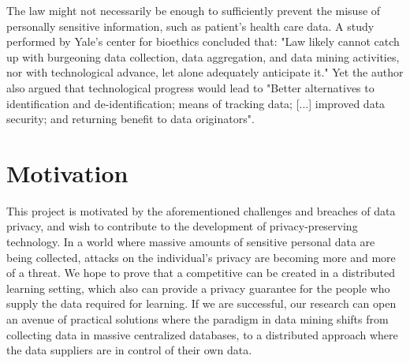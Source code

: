The law might not necessarily be enough to sufficiently prevent the misuse of personally sensitive information, such as patient's health care data. A study performed by Yale's center for bioethics concluded that: "Law likely cannot catch up with burgeoning data collection, data aggregation, and data
mining activities, nor with technological advance, let alone adequately anticipate it." Yet the author also argued that technological progress would lead to "Better alternatives to identification and de-identification;  means of tracking data; [...] improved data security; and returning benefit to data originators"\cite{kaplan2014patient}.

\section{Motivation}
This project is motivated by the aforementioned challenges and breaches of data privacy, and wish to contribute to the development of privacy-preserving technology. In a world where massive amounts of sensitive personal data are being collected, attacks on the individual's privacy are becoming more and more of a threat. We hope to prove that a competitive can be created in a distributed learning setting, which also can provide a privacy guarantee for the people who supply the data required for learning. If we are successful, our research can open an avenue of practical solutions where the paradigm in data mining shifts from collecting data in massive centralized databases, to a distributed approach where the data suppliers are in control of their own data.  


\cleardoublepage